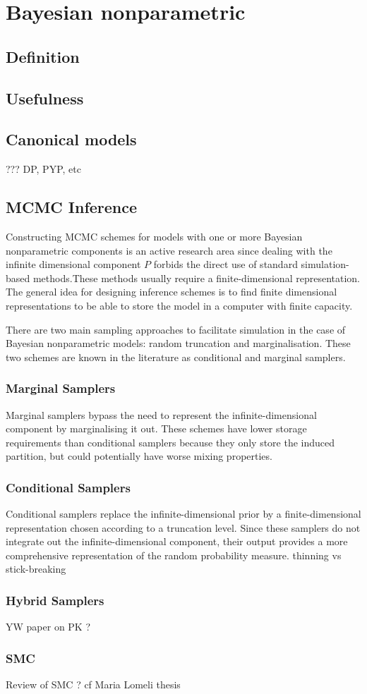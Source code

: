 \chapter{Bayesian nonparametric}

\section{Definition} \label{BNP_def}

\section{Usefulness}

\section{Canonical models}
???
DP, PYP, etc

\section{MCMC Inference}

\quad Constructing MCMC schemes for models with one or more Bayesian nonparametric components is an active research area since dealing with the infinite dimensional component $P$ forbids the direct use of standard simulation-based methods.These methods usually require a finite-dimensional representation. The general idea for designing inference schemes is to find finite dimensional representations to be able to store the model in a computer with finite capacity.

There are two main sampling approaches to facilitate simulation in the case of Bayesian nonparametric models: random truncation and marginalisation. These two schemes are known in the literature as conditional and marginal samplers.

\subsection{Marginal Samplers}
\quad Marginal samplers bypass the need to represent the infinite-dimensional component by marginalising it out. These schemes have lower storage requirements than conditional samplers because they only store the induced partition, but could potentially have worse mixing properties.

\subsection{Conditional Samplers}
\quad Conditional samplers replace the infinite-dimensional prior by a finite-dimensional representation chosen according to a truncation level. Since these samplers do not integrate out the infinite-dimensional component, their output provides a more comprehensive representation of the random probability measure.
thinning vs stick-breaking

\subsection{Hybrid Samplers}
YW paper on PK ?

\subsection{SMC}
Review of SMC ?
cf Maria Lomeli thesis
